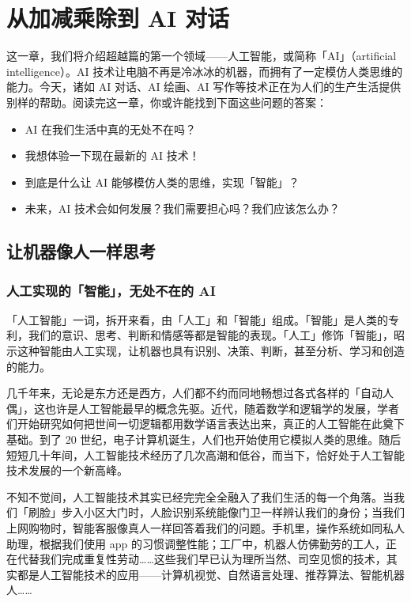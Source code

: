 \chapter{从加减乘除到 AI 对话}
\label{cha:bring-intelligence-to-machines}

\begin{intro}
  这一章，我们将介绍超越篇的第一个领域——人工智能，或简称「AI」（artificial intelligence）。AI 技术让电脑不再是冷冰冰的机器，而拥有了一定模仿人类思维的能力。今天，诸如 AI 对话、AI 绘画、AI 写作等技术正在为人们的生产生活提供别样的帮助。阅读完这一章，你或许能找到下面这些问题的答案：
  \begin{itemize}
    \item AI 在我们生活中真的无处不在吗？
    \item 我想体验一下现在最新的 AI 技术！
    \item 到底是什么让 AI 能够模仿人类的思维，实现「智能」？
    \item 未来，AI 技术会如何发展？我们需要担心吗？我们应该怎么办？
  \end{itemize}
\end{intro}

\section{让机器像人一样思考}

\subsection{人工实现的「智能」，无处不在的 AI}

「人工智能」一词，拆开来看，由「人工」和「智能」组成。「智能」是人类的专利，我们的意识、思考、判断和情感等都是智能的表现。「人工」修饰「智能」，昭示这种智能由人工实现，让机器也具有识别、决策、判断，甚至分析、学习和创造的能力。

几千年来，无论是东方还是西方，人们都不约而同地畅想过各式各样的「自动人偶」，这也许是人工智能最早的概念先驱。近代，随着数学和逻辑学的发展，学者们开始研究如何把世间一切逻辑都用数学语言表达出来，真正的人工智能在此奠下基础。到了 20 世纪，电子计算机诞生，人们也开始使用它模拟人类的思维。随后短短几十年间，人工智能技术经历了几次高潮和低谷，而当下，恰好处于人工智能技术发展的一个新高峰。

不知不觉间，人工智能技术其实已经完完全全融入了我们生活的每一个角落。当我们「刷脸」步入小区大门时，人脸识别系统能像门卫一样辨认我们的身份；当我们上网购物时，智能客服像真人一样回答着我们的问题。手机里，操作系统如同私人助理，根据我们使用 app 的习惯调整性能；工厂中，机器人仿佛勤劳的工人，正在代替我们完成重复性劳动……这些我们早已认为理所当然、司空见惯的技术，其实都是人工智能技术的应用——计算机视觉、自然语言处理、推荐算法、智能机器人……

